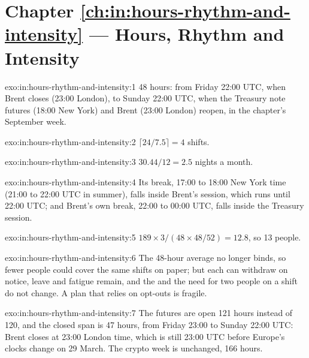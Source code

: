 \section*{Chapter \ref{ch:in:hours-rhythm-and-intensity} --- Hours, Rhythm and Intensity}

\begin{solution}{exo:in:hours-rhythm-and-intensity:1}
48 hours: from Friday 22:00 UTC, when Brent closes (23:00 London), to Sunday 22:00 UTC, when the Treasury note futures
(18:00 New York) and Brent (23:00 London) reopen, in the chapter's September week.
\end{solution}

\begin{solution}{exo:in:hours-rhythm-and-intensity:2}
$\lceil 24/7.5\rceil=4$ shifts.
\end{solution}

\begin{solution}{exo:in:hours-rhythm-and-intensity:3}
$30.44/12=2.5$ nights a month.
\end{solution}

\begin{solution}{exo:in:hours-rhythm-and-intensity:4}
Its break, 17:00 to 18:00 New York time (21:00 to 22:00 UTC in summer), falls inside Brent's session, which runs until
22:00 UTC; and Brent's own break, 22:00 to 00:00 UTC, falls inside the Treasury session.
\end{solution}

\begin{solution}{exo:in:hours-rhythm-and-intensity:5}
$189\times3/(48\times48/52)=12.8$, so 13 people.
\end{solution}

\begin{solution}{exo:in:hours-rhythm-and-intensity:6}
The 48-hour average no longer binds, so fewer people could cover the same shifts on paper; but each can withdraw on
notice, leave and fatigue remain, and the  and the need for two people on a shift do not change. A
plan that relies on opt-outs is fragile.
\end{solution}

\begin{solution}{exo:in:hours-rhythm-and-intensity:7}
The futures are open 121 hours instead of 120, and the closed span is 47 hours, from Friday 23:00 to Sunday 22:00 UTC:
Brent closes at 23:00 London time, which is still 23:00 UTC before Europe's clocks change on 29 March. The crypto week is
unchanged, 166 hours.
\end{solution}

